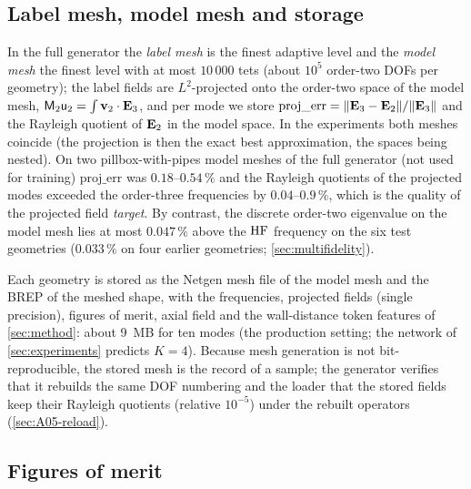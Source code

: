 \subsection{Label mesh, model mesh and storage}\label{sec:05-transfer}

In the full generator the \emph{label mesh} is the finest adaptive level and the \emph{model mesh} the finest level with at most $10\,000$ tets (about $10^5$ order-two DOFs per geometry); the label fields are $L^2$-projected onto the order-two space of the model mesh, $\mathsf M_2\mathsf u_2=\int\mathbf v_2\cdot\mathbf{E}_3$, and per mode we store $\text{proj\_err}=\|\mathbf{E}_3-\mathbf{E}_2\|/\|\mathbf{E}_3\|$ and the Rayleigh quotient of $\mathbf{E}_2$ in the model space.
In the experiments both meshes coincide (the projection is then the exact best approximation, the spaces being nested).
On two pillbox-with-pipes model meshes of the full generator (not used for training) $\text{proj\_err}$ was $0.18$--$0.54\,\%$ and the Rayleigh quotients of the projected modes exceeded the order-three frequencies by $0.04$--$0.9\,\%$, which is the quality of the projected field \emph{target}.
By contrast, the discrete order-two eigenvalue on the model mesh lies at most $0.047\,\%$ above the $\mathrm{HF}$ frequency on the six test geometries ($0.033\,\%$ on four earlier geometries; \cref{sec:multifidelity}).

Each geometry is stored as the Netgen mesh file of the model mesh and the BREP of the meshed shape, with the frequencies, projected fields (single precision), figures of merit, axial field and the wall-distance token features of \cref{sec:method}: about \SI{9}{MB} for ten modes (the production setting; the network of \cref{sec:experiments} predicts $K=4$).
Because mesh generation is not bit-reproducible, the stored mesh is the record of a sample; the generator verifies that it rebuilds the same DOF numbering and the loader that the stored fields keep their Rayleigh quotients (relative $10^{-5}$) under the rebuilt operators (\cref{sec:A05-reload}).

\subsection{Figures of merit}\label{sec:05-qoi}

